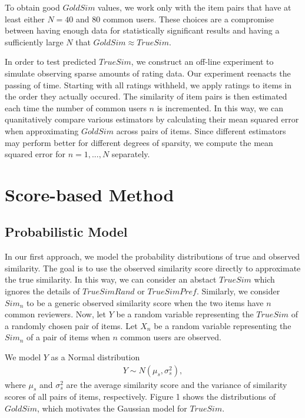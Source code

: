\documentclass[11pt]{article}
\begin{document}
To obtain good $GoldSim$ values, we work only with the item pairs that have at 
least either $N=40$ and $80$ common users. These choices are a compromise 
between having enough data for statistically significant results and having 
a sufficiently large $N$ that $GoldSim \approx TrueSim$. 

In order to test predicted $TrueSim$, we construct an off-line experiment to
simulate observing sparse amounts of rating data. Our experiment reenacts  
the passing of time. Starting with all ratings withheld, we apply ratings to 
items in the order they actually occured. The similarity of item pairs is then
estimated each time the number of common users $n$ is incremented. In this way,
we can quanitatively compare various estimators by calculating their mean
squared error when approximating $GoldSim$ across pairs of items. Since 
different estimators may perform better for different degrees of sparsity, 
we compute the mean squared error for $n=1,...,N$ separately.

\section*{Score-based Method}
\subsection*{Probabilistic Model}

In our first approach, we model the probability distributions of true and 
observed similarity. The goal is to use the observed similarity score directly 
to approximate the true similarity. In this way, we can consider an abstact 
$TrueSim$ which ignores the details of $TrueSimRand$ or $TrueSimPref$. 
Similarly, we consider $Sim_n$ to be a generic observed similarity score when
the two items have $n$ common reviewers. Now, let $Y$ be a random variable 
representing the $TrueSim$ of a randomly chosen pair of items. Let $X_{n}$ be a
random variable representing the $Sim_{n}$ of a pair of items when $n$ common 
users are observed.

We model $Y$ as a Normal distribution 
\begin{align}
Y \sim N(\mu_s, \sigma_{s}^2),
\end{align}
where $\mu_s$ and $\sigma_{s}^2$ are the average similarity score and the variance
of similarity scores of all pairs of items, respectively. Figure 1 shows the
distributions of $GoldSim$, which motivates the Gaussian model for $TrueSim$.
\end{document}
